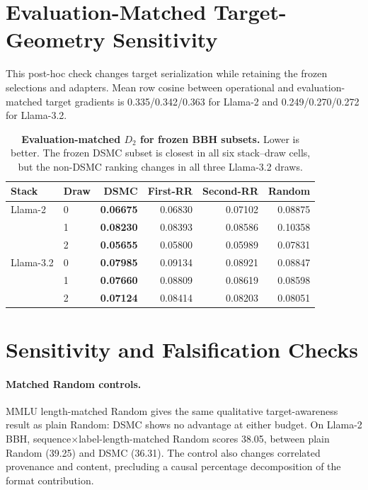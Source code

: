 \documentclass{article}
\newcommand{\method}{\textsc{DSMC}}
\newcommand{\dsecond}{D_2}
\begin{document}
\section{Evaluation-Matched Target-Geometry Sensitivity}
\label{app:evalctx}

This post-hoc check changes target serialization while retaining the frozen
selections and adapters. Mean row cosine between operational and
evaluation-matched target gradients is 0.335/0.342/0.363 for Llama-2 and
0.249/0.270/0.272 for Llama-3.2.

\begin{table}[h]
\caption{\textbf{Evaluation-matched $\dsecond$ for frozen BBH subsets.}
Lower is better. The frozen \method{} subset is closest in all six
stack--draw cells, but the non-\method{} ranking changes in all three
Llama-3.2 draws.}
\label{tab:evalctx}
\centering
\small
\begin{tabular}{llrrrr}
\toprule
Stack & Draw & \method{} & First-RR & Second-RR & Random \\
\midrule
Llama-2 & 0 & \textbf{0.06675} & 0.06830 & 0.07102 & 0.08875 \\
        & 1 & \textbf{0.08230} & 0.08393 & 0.08586 & 0.10358 \\
        & 2 & \textbf{0.05655} & 0.05800 & 0.05989 & 0.07831 \\
\midrule
Llama-3.2 & 0 & \textbf{0.07985} & 0.09134 & 0.08921 & 0.08847 \\
          & 1 & \textbf{0.07660} & 0.08809 & 0.08619 & 0.08598 \\
          & 2 & \textbf{0.07124} & 0.08414 & 0.08203 & 0.08051 \\
\bottomrule
\end{tabular}
\end{table}

\section{Sensitivity and Falsification Checks}
\label{app:sensitivities}

\paragraph{Matched Random controls.}
MMLU length-matched Random gives the same qualitative target-awareness result
as plain Random: DSMC shows no advantage at either budget. On Llama-2 BBH,
sequence$\times$label-length-matched Random scores 38.05, between plain Random
(39.25) and \method{} (36.31). The control also changes correlated provenance
and content, precluding a causal percentage decomposition of the format
contribution.
\end{document}
